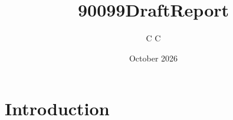 \documentclass{article}
\title{90099DraftReport}
\author{C C}
\date{October 2026}
\begin{document}
\maketitle

\section{Introduction}
\end{document}
